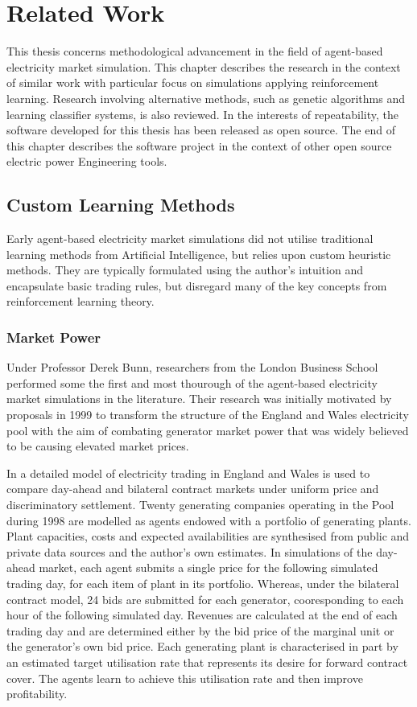\chapter{Related Work}
\label{ch:related_work}
This thesis concerns methodological advancement in the field of agent-based
electricity market simulation.  This chapter describes the research in the
context of similar work with particular focus on simulations applying
reinforcement learning.  Research involving alternative methods, such as
genetic algorithms and learning classifier systems, is also reviewed.  In the
interests of repeatability, the software developed for this thesis has been
released as open source.  The end of this chapter describes the software
project in the context of other open source electric power Engineering tools.

\section{Custom Learning Methods}
Early agent-based electricity market simulations did not utilise traditional
learning methods from Artificial Intelligence, but relies upon custom
heuristic methods.  They are typically formulated using the author's intuition
and encapsulate basic trading rules, but disregard many of the key concepts
from reinforcement learning theory.

\subsection{Market Power}
Under Professor Derek Bunn, researchers from the London Business School
performed some the first and most thourough of the agent-based electricity
market simulations in the literature.  Their research was initially motivated
by proposals in 1999 to transform the structure of the England and Wales
electricity pool with the aim of combating generator market power that was
widely believed to be causing elevated market prices.

In \cite{bower:2001} a
detailed model of electricity trading in England and Wales is used to compare
day-ahead and bilateral contract markets under uniform price and
discriminatory settlement.  Twenty generating companies operating in the Pool
during 1998 are modelled as agents endowed with a portfolio of generating
plants.  Plant capacities, costs and expected availabilities are synthesised
from public and private data sources and the author's own estimates.  In
simulations of the day-ahead market, each agent submits a single price for the
following simulated trading day, for each item of plant in its portfolio.
Whereas, under the bilateral contract model, 24 bids are submitted for each
generator, cooresponding to each hour of the following simulated day.  Revenues
are calculated at the end of each trading day and are determined either by the
bid price of the marginal unit or the generator's own bid price.  Each
generating plant is characterised in part by an estimated target utilisation
rate that represents its desire for forward contract cover.  The agents learn
to achieve this utilisation rate and then improve profitability.

